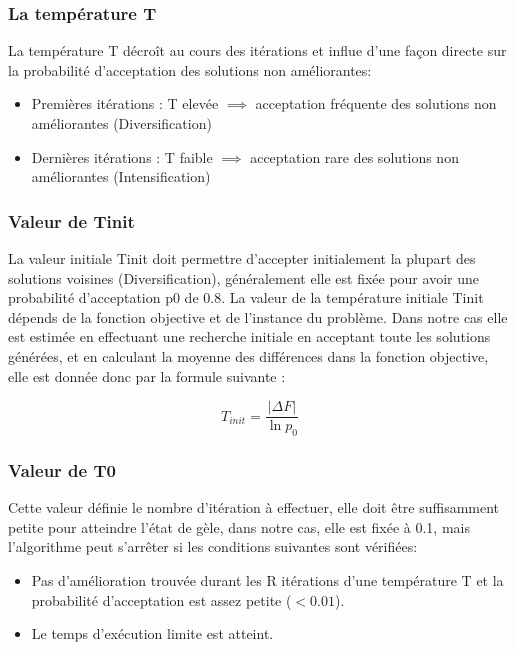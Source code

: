 \documentclass[12pt]{article}
\begin{document}
\subsubsection{La température T}
La température T décroît au cours des itérations et influe d’une façon directe sur la probabilité d’acceptation des solutions non améliorantes: 
\begin{itemize}
    \item Premières itérations : T elevée $\implies $ acceptation fréquente des solutions non améliorantes (Diversification)
    \item Dernières itérations : T faible $\implies $ acceptation rare des solutions non améliorantes (Intensification) 
    
\end{itemize}

\subsubsection{Valeur de Tinit}
La valeur initiale Tinit doit permettre d’accepter initialement la plupart des solutions voisines (Diversification), généralement elle est fixée pour avoir une probabilité d’acceptation p0 de 0.8. 
La valeur de la température initiale Tinit dépends de la fonction objective et de l’instance du problème. Dans notre cas elle est estimée en effectuant une recherche initiale en acceptant toute les solutions générées, et en calculant la moyenne des différences dans la fonction objective, elle est donnée donc par la formule suivante : 

\begin{equation}
    T_{init} = \frac{|\Delta F|}{\ln p_{0}}
\end{equation}
\subsubsection{Valeur de T0}
Cette valeur définie le nombre d’itération à effectuer, elle doit être suffisamment petite pour atteindre l’état de gèle, dans notre cas, elle est fixée à 0.1, mais l’algorithme peut s’arrêter si les conditions suivantes sont vérifiées: 
\begin{itemize}
    \item Pas d’amélioration trouvée durant les R itérations d’une température T
    et la probabilité d’acceptation est assez petite ($<0.01$).
    \item Le temps d'exécution limite est atteint.
\end{itemize}
\end{document}
